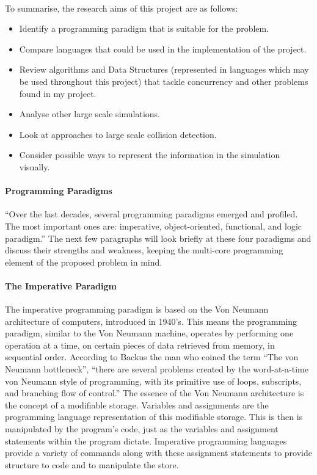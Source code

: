 \documentclass[main.tex]{subfiles}
\begin{document}
\paragraph{}To summarise, the research aims of this project are as follows:
\begin{itemize}
	\item Identify a programming paradigm that is suitable for the problem.
	\item Compare languages that could be used in the implementation of the project.
	\item Review algorithms and Data Structures (represented in languages which may be used throughout this project) that tackle concurrency and other problems found in my project.
	\item Analyse other large scale simulations.
	\item Look at approaches to large scale collision detection.
	\item Consider possible ways to represent the information in the simulation visually.
\end{itemize}


\paragraph{Programming Paradigms}``Over the last decades, several programming paradigms emerged and profiled. The most important ones are: imperative, object-oriented, functional, and logic paradigm.''\cite{Vujosevic2008} The next few paragraphs will look briefly at these four paradigms and discuss their strengths and weakness, keeping the multi-core programming element of the proposed problem in mind.

\paragraph{The Imperative Paradigm}The imperative programming paradigm is based on the Von Neumann architecture of computers, introduced in 1940’s. \cite{Vujosevic2008} This means the programming paradigm, similar to the Von Neumann machine, operates by performing one operation at a time, on certain pieces of data retrieved from memory, in sequential order. According to Backus \cite{Backus1978} the man who coined the term ``The von Neumann bottleneck'', ``there are several problems created by the word-at-a-time von Neumann style of programming, with its primitive use of loops, subscripts, and branching flow of control.'' The essence of the Von Neumann architecture is the concept of a modifiable storage. Variables and assignments are the programming language representation of this modifiable storage. This is then is manipulated by the program's code, just as the variables and assignment statements within the program dictate. Imperative programming languages provide a variety of commands along with these assignment statements to provide structure to code and to manipulate the store.\cite{Aaby1996}
\end{document}
